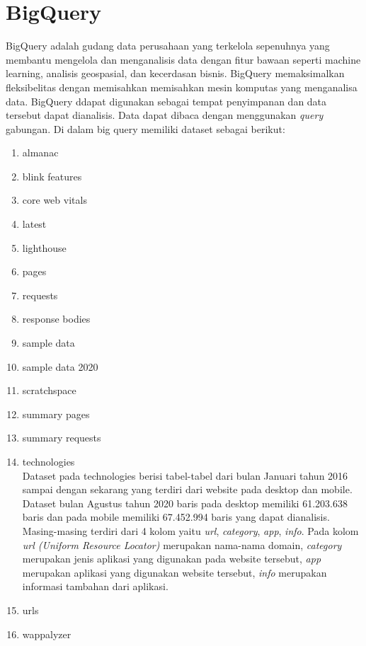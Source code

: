 \section{BigQuery}
BigQuery adalah gudang data perusahaan yang terkelola sepenuhnya yang membantu mengelola dan menganalisis data dengan fitur bawaan seperti machine learning, analisis geospasial, dan kecerdasan bisnis. BigQuery memaksimalkan fleksibelitas dengan memisahkan memisahkan mesin komputas yang menganalisa data. BigQuery ddapat digunakan sebagai tempat penyimpanan dan data tersebut dapat dianalisis. Data dapat dibaca dengan menggunakan \textit{query} gabungan. Di dalam big query memiliki dataset sebagai berikut:
\begin{enumerate}
	\item almanac\\
	\item blink features\\
	\item core web vitals\\
	\item latest\\
	\item lighthouse\\
	\item pages\\
	\item requests\\
	\item response bodies\\
	\item sample data\\
	\item sample data 2020\\
	\item scratchspace\\
	\item summary pages\\
	\item summary requests\\
	\item technologies\\
	Dataset pada technologies berisi tabel-tabel dari bulan Januari tahun 2016 sampai dengan sekarang yang terdiri dari website pada desktop dan mobile. Dataset bulan Agustus tahun 2020 baris pada desktop memiliki 61.203.638 baris dan pada mobile memiliki 67.452.994 baris yang dapat dianalisis. Masing-masing terdiri dari 4 kolom yaitu \textit{url}, \textit{category}, \textit{app}, \textit{info}. Pada kolom \textit{url (Uniform Resource Locator)} merupakan nama-nama domain, \textit{category} merupakan jenis aplikasi yang digunakan pada website tersebut, \textit{app} merupakan aplikasi yang digunakan website tersebut, \textit{info} merupakan informasi tambahan dari aplikasi. 
	\item urls\\
	\item wappalyzer\\
\end{enumerate}




